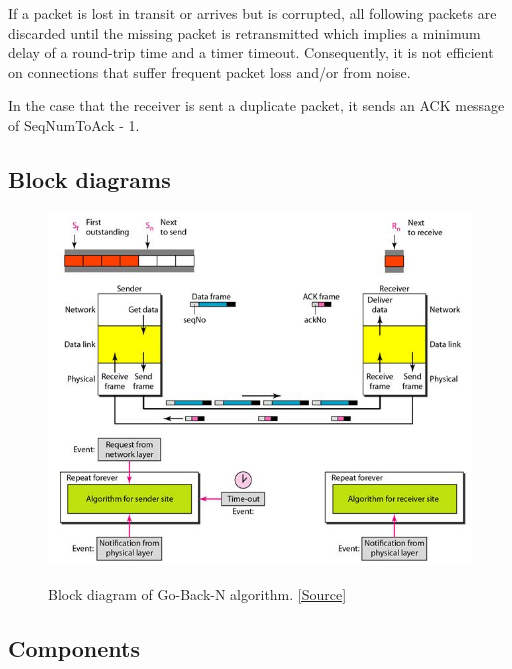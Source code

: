 \documentclass[12pt]{article}
\begin{document}
If a packet is lost in transit or arrives but is corrupted, all following packets are discarded until the missing packet is retransmitted which implies a minimum delay of a round-trip time and a timer timeout. Consequently, it is not efficient on connections that suffer frequent packet loss and/or from noise.

In the case that the receiver is sent a duplicate packet, it sends an ACK message of SeqNumToAck - 1.


\newpage
\subsection{Block diagrams}

\begin{figure}[h!]
	\caption{Block diagram of Go-Back-N algorithm. \href{http://www.myreadingroom.co.in/notes-and-studymaterial/68-dcn/813-go-back-n-arq-protocol.html}{[Source]}}
	\centering
	\includegraphics[width=\linewidth]{gbn.jpg}
	\label{fig:fig1}
\end{figure}

\subsection{Components}
\end{document}
